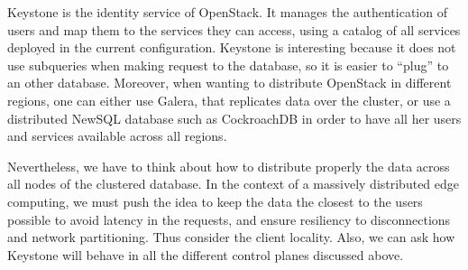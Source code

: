 Keystone is the identity service of OpenStack. It manages the authentication of users and map them to the services they can access, using a catalog of all services deployed in the current configuration. Keystone is interesting because it does not use subqueries when making request to the database, so it is easier to ``plug'' to an other database. Moreover, when wanting to distribute OpenStack in different regions, one can either use Galera, that replicates data over the cluster, or use a distributed NewSQL database such as CockroachDB in order to have all her users and services available across all regions.

Nevertheless, we have to think about how to distribute properly the data across all nodes of the clustered database. In the context of a massively distributed edge computing, we must push the idea to keep the data the closest to the users possible to avoid latency in the requests, and ensure resiliency to disconnections and network partitioning. Thus consider the client locality. Also, we can ask how Keystone will behave in all the different control planes discussed above.
